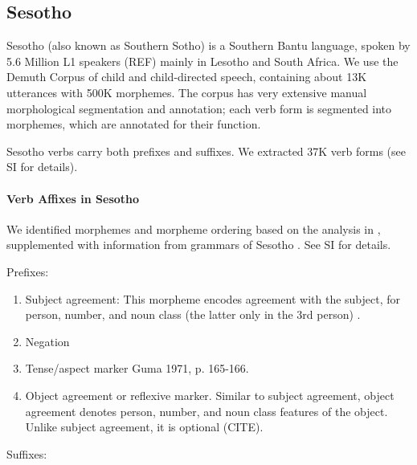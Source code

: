 \subsection{Sesotho}

Sesotho (also known as Southern Sotho) is a Southern Bantu language, spoken by 5.6 Million L1 speakers (REF) mainly in Lesotho and South Africa.
We use the Demuth Corpus \citep{demuth1992acquisition} of child and child-directed speech, containing about 13K utterances with 500K morphemes.
The corpus has very extensive manual morphological segmentation and annotation; each verb form is segmented into morphemes, which are annotated for their function.

Sesotho verbs carry both prefixes and suffixes.
We extracted 37K verb forms (see SI for details).


\paragraph{Verb Affixes in Sesotho}

We identified morphemes and morpheme ordering based on the analysis in \cite{demuth1992acquisition}, supplemented with information from grammars of Sesotho \citep{doke1967textbook,guma1971outline}. See SI for details.

Prefixes:

\begin{enumerate}
    \item Subject agreement: This morpheme encodes agreement with the subject, for person, number, and noun class (the latter only in the 3rd person) \cite[]{doke1967textbook}.
    
    \item Negation 
    
    \item Tense/aspect marker  Guma 1971, p. 165-166. \cite[-424]{doke1967textbook}
    
    \item Object agreement or reflexive marker. 
    Similar to subject agreement, object agreement denotes person, number, and noun class features of the object.
    Unlike subject agreement, it is optional (CITE).
    \end{enumerate}
    
    Suffixes:
    
